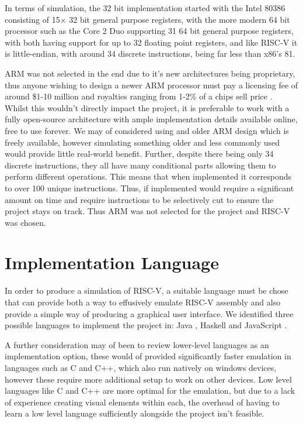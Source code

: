 In terms of simulation, the 32 bit implementation started with the Intel 80386 \cite{intel_1998_intel386} consisting of 15$\times$ 32 bit general purpose registers, with the more modern 64 bit  processor such as the Core 2 Duo \cite{intel_2007_intel} supporting 31 64 bit general purpose registers, with both having support for up to 32 floating point registers, and like RISC-V it is little-endian, with around 34 discrete instructions, being far less than x86's 81.

ARM was not selected in the end due to it's new architectures being proprietary, thus anyone wishing to design a newer ARM processor must pay a licensing fee of around \$1-10 million and royalties ranging from 1-2\% of a chips sell price \cite{strategyzerag_2014_arm}. Whilst this wouldn't directly impact the project, it is preferable to work with a fully open-source architecture with ample implementation details available online, free to use forever. We may of considered using and older ARM design which is freely available, however simulating something older and less commonly used would provide little real-world benefit. Further, despite there being only 34 discrete instructions, they all have many conditional parts allowing them to perform different operations. This means that when implemented it corresponds to over 100 unique instructions. Thus, if implemented would require a significant amount on time and require instructions to be selectively cut to ensure the project stays on track. Thus ARM was not selected for the project and RISC-V was chosen.

\section{Implementation Language}
In order to produce a simulation of RISC-V, a suitable language must be chose that can provide both a way to effusively emulate RISC-V assembly and also provide a simple way of producing a graphical user interface. We identified three possible languages to implement the project in: Java \cite{sunmicrosystems_2022_java}, Haskell \cite{marlow_2010_haskell} and JavaScript \cite{ecmainternational_2023_ecmascript}.

A further consideration may of been to review lower-level languages as an implementation option, these would of provided significantly faster emulation in languages such as C and C++, which also run natively on windows devices, however these require more additional setup to work on other devices. Low level languages like C and C++ are more optimal for the emulation, but due to a lack of experience creating visual elements within each, the overhead of having to learn a low level language sufficiently alongside the project isn't feasible.

